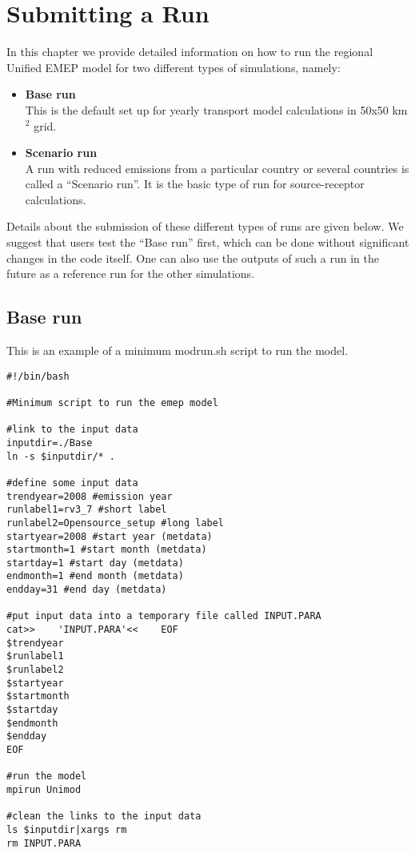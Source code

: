 \chapter{Submitting a Run}
\label{ch:SubmitARun}

In this chapter we provide detailed information on how to run the
regional Unified EMEP model for two different types of
simulations, namely: 

\begin{itemize}

\item {\bf Base run} \\
This is the default set up for yearly transport model calculations
in 50x50 km$^2$ grid. 
\item{\bf Scenario run} \\
 A run with reduced emissions from a particular country or several
 countries is called 
a ``Scenario run''. It is the basic type of run for source-receptor
calculations. 

\end{itemize}

\noindent
Details about the submission of these
different types of runs are given below. We suggest that users test
the ``Base run'' first, which can be done without significant changes in
the code itself. One can also use the outputs of such a run in the
future as a reference run for the other simulations.\\  
% 

\newpage
\section{Base run}

This is an example of a minimum modrun.sh script to run the model.


\begin{verbatim}
#!/bin/bash

#Minimum script to run the emep model

#link to the input data
inputdir=./Base
ln -s $inputdir/* .

#define some input data
trendyear=2008 #emission year
runlabel1=rv3_7 #short label
runlabel2=Opensource_setup #long label
startyear=2008 #start year (metdata)
startmonth=1 #start month (metdata)
startday=1 #start day (metdata)
endmonth=1 #end month (metdata)
endday=31 #end day (metdata)

#put input data into a temporary file called INPUT.PARA
cat>>    'INPUT.PARA'<<    EOF
$trendyear
$runlabel1
$runlabel2
$startyear
$startmonth
$startday
$endmonth
$endday
EOF

#run the model
mpirun Unimod

#clean the links to the input data
ls $inputdir|xargs rm
rm INPUT.PARA

\end{verbatim}

